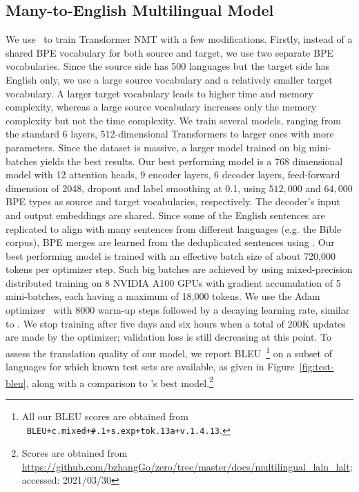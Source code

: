 \subsection{Many-to-English Multilingual Model}
\label{sec:500eng-model}
We use \rtg\ to train Transformer NMT \cite{vaswani2017attention} with a few modifications.
Firstly, instead of a shared BPE vocabulary for both source and target, we use two separate BPE vocabularies. 
Since the source side has 500 languages but the target side has English only, we use a large source vocabulary and a relatively smaller target vocabulary.
A larger target vocabulary leads to higher time and memory complexity, whereas a large source vocabulary increases only the memory complexity but not the time complexity.
We train several models, ranging from the standard 6 layers, 512-dimensional Transformers to larger ones with more parameters. Since the dataset is massive, a larger model trained on big mini-batches yields the best results. Our best performing model is a 768 dimensional model with 12 attention heads, 9 encoder layers, 6 decoder layers, feed-forward dimension of 2048, dropout and label smoothing at 0.1, using $512,000$ and $64,000$ BPE types as source and target vocabularies, respectively. The decoder's input and output embeddings are shared.
Since some of the English sentences are replicated to align with many sentences from different languages (e.g. the Bible corpus), BPE merges are learned from the deduplicated sentences using \nlcodec.
Our best performing model is trained with an effective batch size of about 720,000 tokens per optimizer step. Such big batches are achieved by using mixed-precision distributed training on 8 NVIDIA A100 GPUs with gradient accumulation of 5 mini-batches, each having a maximum of 18,000 tokens. We use the Adam optimizer~\cite{kingma2015adam} with 8000 warm-up steps followed by a decaying learning rate, similar to \citet{vaswani2017attention}. 
We stop training after five days and six hours when a total of 200K updates are made by the optimizer; validation loss is still decreasing at this point. 
To assess the translation quality of our model, we report BLEU~\cite{papineni-etal-2002-bleu,post-2018-sacrebleu}\footnote{All our BLEU scores are obtained from \sacrebleu\ \texttt{BLEU+c.mixed+\#.1+s.exp+tok.13a+v.1.4.13}.} on a subset of languages for which known test sets are available, as given in Figure~\ref{fig:test-bleu}, along with a comparison to \citet{zhang-etal-2020-multiling-nmt}'s best model.\footnote{
Scores are obtained from \url{https://github.com/bzhangGo/zero/tree/master/docs/multilingual_laln_lalt}; accessed: 2021/03/30}

